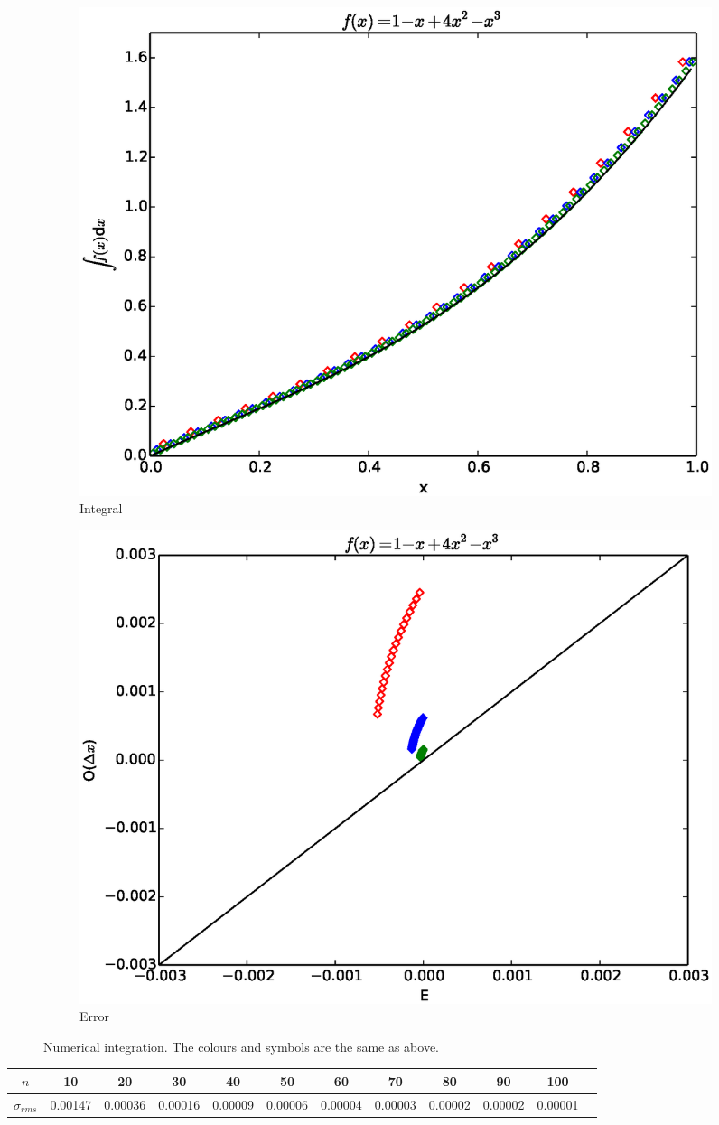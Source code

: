 \documentclass{scrartcl}
\begin{document}
\begin{figure}
	\centering
	\begin{subfigure}[b]{0.45\textwidth}
		\includegraphics[width=\textwidth]{integ.ps}
		\caption{Integral}
	\end{subfigure}
	\begin{subfigure}[b]{0.45\textwidth}
		\includegraphics[width=\textwidth]{ierr.ps}
		\caption{Error}
	\end{subfigure}
	\label{fig:integ}
	\caption{Numerical integration.  The colours and symbols are the same as above.}
\end{figure}
\begin{center}
	\begin{tabular}{c|ccccccccccc}
		$n$ & 10 & 20 & 30 & 40 & 50 & 60 & 70 & 80 & 90 & 100 \\\hline
		$\sigma_{rms}$ & 0.00147 & 0.00036 & 0.00016 & 0.00009 & 0.00006 & 0.00004 & 0.00003 & 0.00002 & 0.00002 & 0.00001
	\end{tabular}
\end{center}
\end{document}
